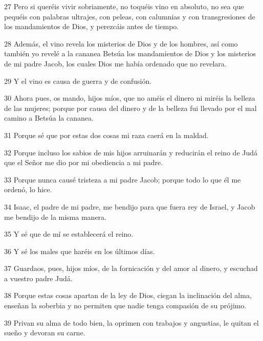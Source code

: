 \par 27 Pero si queréis vivir sobriamente, no toquéis vino en absoluto, no sea que pequéis con palabras ultrajes, con peleas, con calumnias y con transgresiones de los mandamientos de Dios, y perezcáis antes de tiempo.

\par 28 Además, el vino revela los misterios de Dios y de los hombres, así como también yo revelé a la cananea Betsúa los mandamientos de Dios y los misterios de mi padre Jacob, los cuales Dios me había ordenado que no revelara.

\par 29 Y el vino es causa de guerra y de confusión.

\par 30 Ahora pues, os mando, hijos míos, que no améis el dinero ni miréis la belleza de las mujeres; porque por causa del dinero y de la belleza fui llevado por el mal camino a Betsúa la cananea.

\par 31 Porque sé que por estas dos cosas mi raza caerá en la maldad.

\par 32 Porque incluso los sabios de mis hijos arruinarán y reducirán el reino de Judá que el Señor me dio por mi obediencia a mi padre.

\par 33 Porque nunca causé tristeza a mi padre Jacob; porque todo lo que él me ordenó, lo hice.

\par 34 Isaac, el padre de mi padre, me bendijo para que fuera rey de Israel, y Jacob me bendijo de la misma manera.

\par 35 Y sé que de mí se establecerá el reino.

\par 36 Y sé los males que haréis en los últimos días.

\par 37 Guardaos, pues, hijos míos, de la fornicación y del amor al dinero, y escuchad a vuestro padre Judá.

\par 38 Porque estas cosas apartan de la ley de Dios, ciegan la inclinación del alma, enseñan la soberbia y no permiten que nadie tenga compasión de su prójimo.

\par 39 Privan su alma de todo bien, la oprimen con trabajos y angustias, le quitan el sueño y devoran su carne.

